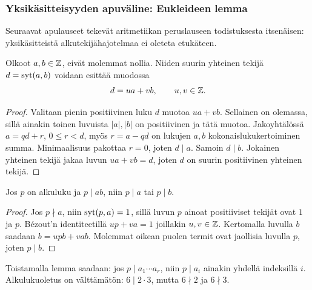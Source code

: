 \documentclass[11pt,a4paper]{amsart}
\begin{document}
\subsubsection{Yksikäsitteisyyden apuväline: Eukleideen lemma}
Seuraavat apulauseet tekevät aritmetiikan peruslauseen todistuksesta
itsenäisen: yksikäsitteistä alkutekijähajotelmaa ei oleteta etukäteen.

\begin{lemma}
  Olkoot $a,b\in\mathbb{Z}$, eivät molemmat nollia. Niiden suurin yhteinen
  tekijä $d=\operatorname{syt}(a,b)$ voidaan esittää muodossa
  \[
    d=ua+vb,\qquad u,v\in\mathbb{Z}.
  \]
\end{lemma}
\begin{proof}
  Valitaan pienin positiivinen luku $d$ muotoa $ua+vb$.
  Sellainen on olemassa, sillä ainakin toinen luvuista $|a|,|b|$
  on positiivinen ja tätä muotoa. Jakoyhtälössä $a=qd+r$,
  $0\le r<d$, myös $r=a-qd$ on lukujen $a,b$ kokonaislukukertoiminen
  summa. Minimaalisuus pakottaa $r=0$, joten $d\mid a$.
  Samoin $d\mid b$. Jokainen yhteinen tekijä jakaa luvun $ua+vb=d$,
  joten $d$ on suurin positiivinen yhteinen tekijä.
\end{proof}

\begin{lemma}
  Jos $p$ on alkuluku ja $p\mid ab$, niin $p\mid a$ tai $p\mid b$.
\end{lemma}
\begin{proof}
  Jos $p\nmid a$, niin $\operatorname{syt}(p,a)=1$, sillä luvun $p$ ainoat
  positiiviset tekijät ovat $1$ ja $p$. Bézout'n identiteetillä
  $up+va=1$ joillakin $u,v\in\mathbb{Z}$. Kertomalla luvulla $b$ saadaan
  $b=upb+vab$. Molemmat oikean puolen termit ovat jaollisia luvulla
  $p$, joten $p\mid b$.
\end{proof}
Toistamalla lemma saadaan: jos $p\mid a_1\cdots a_r$, niin
$p\mid a_i$ ainakin yhdellä indeksillä $i$.
Alkulukuoletus on välttämätön: $6\mid2\cdot3$, mutta
$6\nmid2$ ja $6\nmid3$.
\end{document}
